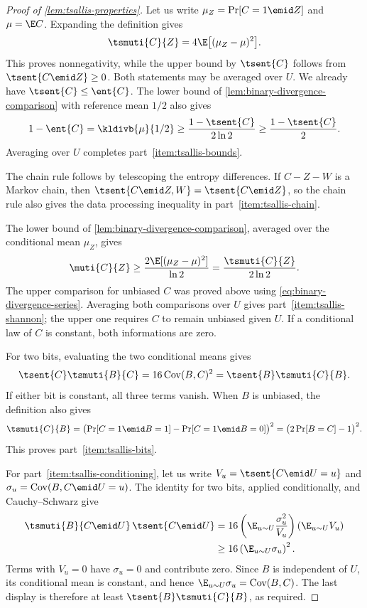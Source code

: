 \begin{proof}[Proof of \autoref{lem:tsallis-properties}]
Let us write $\mu_Z=\Pr[C=1\emid Z]$ and $\mu=\E C$.
Expanding the definition gives
\begin{equation*}
  \tsmuti{C}{Z}=4\E\bigl[(\mu_Z-\mu)^2\bigr].
\end{equation*}
This proves nonnegativity, while the upper bound by $\tsent{C}$
follows from $\tsent{C\emid Z}\ge0$. Both statements may be
averaged over $U$.
We already have $\tsent{C}\le\ent{C}$. The lower bound of
\autoref{lem:binary-divergence-comparison} with reference mean
$1/2$ also gives
\begin{equation*}
  1-\ent{C}=\kldivb{\mu}{1/2}
  \ge\frac{1-\tsent{C}}{2\ln2}
  \ge\frac{1-\tsent{C}}2.
\end{equation*}
Averaging over $U$ completes part~\ref{item:tsallis-bounds}.

The chain rule follows by telescoping the entropy differences.
If $C-Z-W$ is a Markov chain, then
$\tsent{C\emid Z,W}=\tsent{C\emid Z}$, so the chain rule
also gives the data processing inequality in
part~\ref{item:tsallis-chain}.

The lower bound of \autoref{lem:binary-divergence-comparison},
averaged over the conditional mean $\mu_Z$, gives
\begin{equation*}
  \muti{C}{Z}\ge\frac{2\E[(\mu_Z-\mu)^2]}{\ln2}
  =\frac{\tsmuti{C}{Z}}{2\ln2}.
\end{equation*}
The upper comparison for unbiased $C$ was proved above using
\eqref{eq:binary-divergence-series}. Averaging both comparisons
over $U$ gives part~\ref{item:tsallis-shannon}; the upper one
requires $C$ to remain unbiased given $U$. If a conditional law
of $C$ is constant, both informations are zero.

For two bits, evaluating the two conditional means gives
\begin{equation*}
  \tsent{C}\tsmuti{B}{C}
  =16\operatorname{Cov}(B,C)^2
  =\tsent{B}\tsmuti{C}{B}.
\end{equation*}
If either bit is constant, all three terms vanish.
When $B$ is unbiased, the definition also gives
\begin{equation*}
  \tsmuti{C}{B}
  =\bigl(\Pr[C=1\emid B=1]-\Pr[C=1\emid B=0]\bigr)^2
  =\bigl(2\Pr[B=C]-1\bigr)^2.
\end{equation*}
This proves part~\ref{item:tsallis-bits}.

For part~\ref{item:tsallis-conditioning}, let us write
$V_u=\tsent{C\emid U=u}$ and
$\sigma_u=\operatorname{Cov}(B,C\emid U=u)$.
The identity for two bits, applied conditionally, and
Cauchy--Schwarz give
\begin{align*}
  \tsmuti{B}{C\emid U}\,\tsent{C\emid U}
  &=16\left(\E_{u\sim U}\frac{\sigma_u^2}{V_u}\right)
  \left(\E_{u\sim U}V_u\right)\\
  &\ge16\left(\E_{u\sim U}\sigma_u\right)^2.
\end{align*}
Terms with $V_u=0$ have $\sigma_u=0$ and contribute zero.
Since $B$ is independent of $U$, its conditional mean is constant,
and hence $\E_{u\sim U}\sigma_u=\operatorname{Cov}(B,C)$.
The last display is therefore at least
$\tsent{B}\tsmuti{C}{B}$, as required.


\end{proof}
